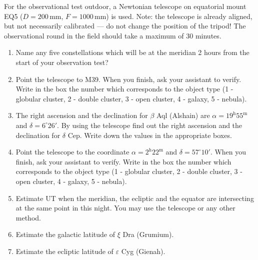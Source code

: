 For the observational test outdoor, a Newtonian telescope on equatorial
mount EQ5 ($D = 200$\,mm, $F = 1000$\,mm) is used. Note: the telescope is
already aligned, but not necessarily calibrated --- do not change the
position of the tripod! The observational round in the field should take a
maximum of 30 minutes.

\begin{enumerate}
\item Name any five constellations which will be at the meridian 2 hours
  from the start of your observation test?
\item Point the telescope to M39. When you finish, ask your assistant to
  verify. Write in the box the number which corresponds to the object type
  (1 - globular cluster, 2 - double cluster, 3 - open cluster, 4 - galaxy,
  5 - nebula).
\item The right ascension and the declination for $\beta$ Aql (Alshain) are
  $\alpha = 19^{\mathrm{h}}55^{\mathrm{m}}$ and $\delta = 6^\circ 26'$. By
  using the telescope find out the right ascension and the declination for
  $\delta$ Cep. Write down the values in the appropriate boxes.
\item Point the telescope to the coordinate
  $\alpha = 2^{\mathrm{h}}22^{\mathrm{m}}$ and $\delta = 57^\circ 10'$. When
  you finish, ask your assistant to verify. Write in the box the number
  which corresponds to the object type (1 - globular cluster, 2 - double
  cluster, 3 - open cluster, 4 - galaxy, 5 - nebula).
\item Estimate UT when the meridian, the ecliptic and the equator are
  intersecting at the same point in this night. You may use the telescope or
  any other method.
\item Estimate the galactic latitude of $\xi$ Dra (Grumium).
\item Estimate the ecliptic latitude of $\varepsilon$ Cyg (Gienah).
\end{enumerate}
